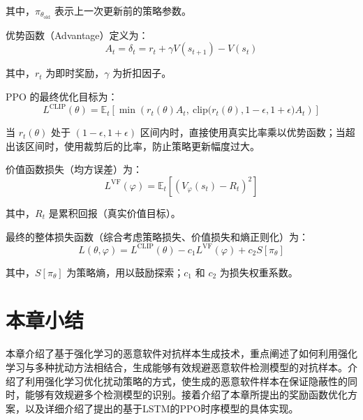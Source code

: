 其中，\(\pi_{\theta_{\text{old}}}\) 表示上一次更新前的策略参数。

优势函数（Advantage）定义为：
\begin{equation}
	A_t = \delta_t = r_t + \gamma V(s_{t+1}) - V(s_t) \tag{4.12}
\end{equation}

其中，\(r_t\) 为即时奖励，\(\gamma\) 为折扣因子。

PPO 的最终优化目标为：
\begin{equation}
	L^{\text{CLIP}}(\theta) = \mathbb{E}_t \left[ \min \left( r_t(\theta) A_t, \ \text{clip}\big(r_t(\theta), 1-\epsilon, 1+\epsilon\big) A_t \right) \right] \tag{4.13}
\end{equation}

当 \(r_t(\theta)\) 处于 \((1-\epsilon, 1+\epsilon)\) 区间内时，直接使用真实比率乘以优势函数；当超出该区间时，使用裁剪后的比率，防止策略更新幅度过大。

价值函数损失（均方误差）为：
\begin{equation}
	L^{\text{VF}}(\varphi) = \mathbb{E}_t \left[ \left(V_{\varphi}(s_t) - R_t\right)^2 \right] \tag{4.14}
\end{equation}

其中，\(R_t\) 是累积回报（真实价值目标）。

最终的整体损失函数（综合考虑策略损失、价值损失和熵正则化）为：
\begin{equation}
	L(\theta, \varphi) = L^{\text{CLIP}}(\theta) - c_1 L^{\text{VF}}(\varphi) + c_2 S[\pi_{\theta}] \tag{4.15}
\end{equation}

其中，\(S[\pi_{\theta}]\) 为策略熵，用以鼓励探索；\(c_1\) 和 \(c_2\) 为损失权重系数。

\section{本章小结}

本章介绍了基于强化学习的恶意软件对抗样本生成技术，重点阐述了如何利用强化学习与多种扰动方法相结合，生成能够有效规避恶意软件检测模型的对抗样本。介绍了利用强化学习优化扰动策略的方式，使生成的恶意软件样本在保证隐蔽性的同时，能够有效规避多个检测模型的识别。接着介绍了本章所提出的奖励函数优化方案，以及详细介绍了提出的基于LSTM的PPO时序模型的具体实现。





